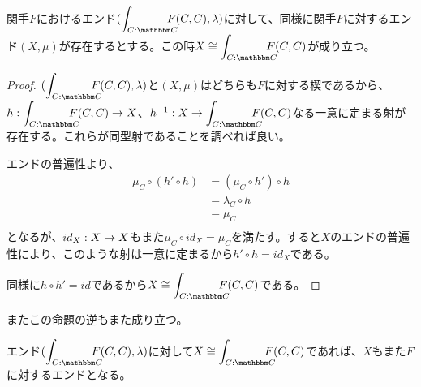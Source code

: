   \begin{prop}[エンドの一意性]
    関手$F$におけるエンド$(\cend{C}{C}F(C,C),\lambda)$に対して、同様に関手$F$に対するエンド$(X,\mu)$が存在するとする。この時$X\cong\cend{C}{C}F(C,C)$が成り立つ。
  \end{prop}
  \begin{proof}
    $(\cend{C}{C}F(C,C),\lambda)$と$(X,\mu)$はどちらも$F$に対する楔であるから、$\mor{h}{\cend{C}{C}F(C,C)}{X}$、$\mor{h^{-1}}{X}{\cend{C}{C}F(C,C)}$なる一意に定まる射が存在する。これらが同型射であることを調べれば良い。

    エンドの普遍性より、
    \begin{align*}
      \mu_C\circ(h'\circ h) &=(\mu_C\circ h')\circ h\\
      &= \lambda_C \circ h\\
      &=\mu_C\\
    \end{align*}
    となるが、$id_X:X\rightarrow X$もまた$\mu_C\circ id_X = \mu_C$を満たす。すると$X$のエンドの普遍性により、このような射は一意に定まるから$h'\circ h=id_X$である。
    \begin{center}
    \end{center}
    同様に$h\circ h'=id$であるから$X\cong\cend{C}{C}F(C,C)$である。
  \end{proof}
  またこの命題の逆もまた成り立つ。
  \begin{prop}[同型のエンドの保存]
    エンド$(\cend{C}{C}F(C,C),\lambda)$に対して$X\cong \cend{C}{C}F(C,C)$であれば、$X$もまた$F$に対するエンドとなる。
  \end{prop}
